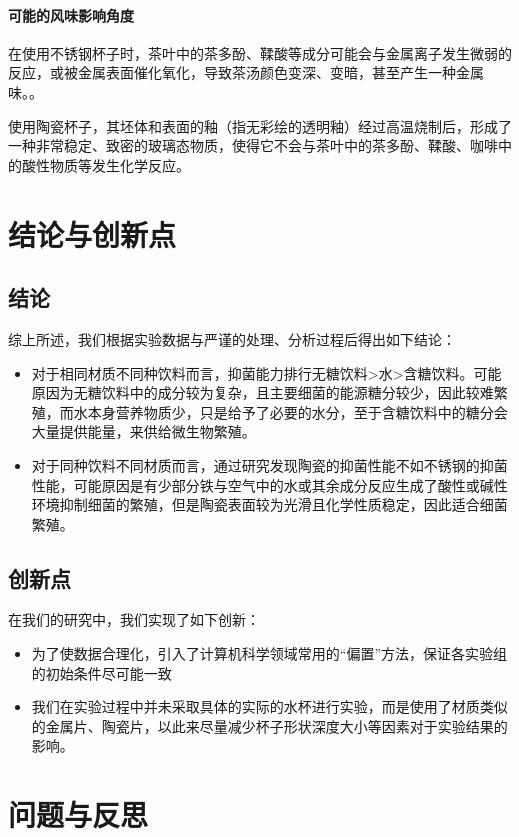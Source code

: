 \documentclass[12pt,a4paper]{ctexart}
\begin{document}
\paragraph{可能的风味影响角度}
在使用不锈钢杯子时，茶叶中的茶多酚、鞣酸等成分可能会与金属离子发生微弱的反应，或被金属表面催化氧化，导致茶汤颜色变深、变暗，甚至产生一种金属味。\cite{JSHJ201504002}。

使用陶瓷杯子，其坯体和表面的釉（指无彩绘的透明釉）经过高温烧制后，形成了一种非常稳定、致密的玻璃态物质，使得它不会与茶叶中的茶多酚、鞣酸、咖啡中的酸性物质等发生化学反应。 

\section{结论与创新点}
\subsection{结论}
综上所述，我们根据实验数据与严谨的处理、分析过程后得出如下结论：
\begin{itemize}
    \item 对于相同材质不同种饮料而言，抑菌能力排行无糖饮料>水>含糖饮料。可能原因为无糖饮料中的成分较为复杂，且主要细菌的能源糖分较少，因此较难繁殖，而水本身营养物质少，只是给予了必要的水分，至于含糖饮料中的糖分会大量提供能量，来供给微生物繁殖。
    \item 对于同种饮料不同材质而言，通过研究发现陶瓷的抑菌性能不如不锈钢的抑菌性能，可能原因是有少部分铁与空气中的水或其余成分反应生成了酸性或碱性环境抑制细菌的繁殖，但是陶瓷表面较为光滑且化学性质稳定，因此适合细菌繁殖。
\end{itemize}

\subsection{创新点}
在我们的研究中，我们实现了如下创新：
\begin{itemize}
    \item 为了使数据合理化，引入了计算机科学领域常用的“偏置”方法，保证各实验组的初始条件尽可能一致
    \item 我们在实验过程中并未采取具体的实际的水杯进行实验，而是使用了材质类似的金属片、陶瓷片，以此来尽量减少杯子形状深度大小等因素对于实验结果的影响。
\end{itemize}

\section{问题与反思}\label{sec:problem}
\end{document}
